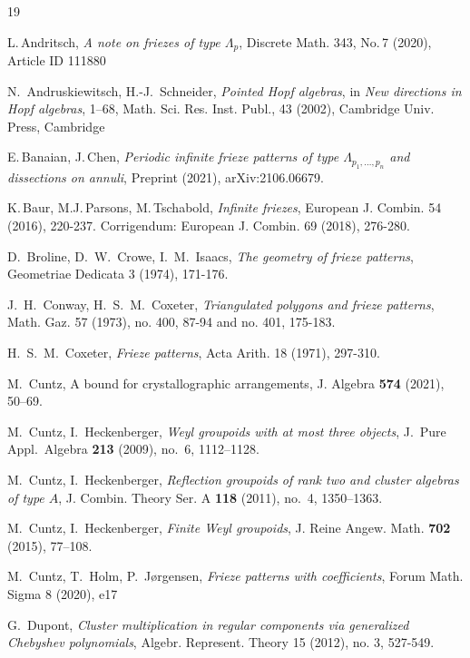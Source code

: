 \documentclass[11pt,a4paper]{amsart}
\theoremstyle{definition}
\numberwithin{equation}{section}
\begin{document}
\begin{thebibliography}{19}


L.\,Andritsch,
{\em A note on friezes of type $\Lambda_p$},
Discrete Math. 343, No.\,7 (2020), Article ID 111880

N.\ Andruskiewitsch, H.-J.\ Schneider,
{\em Pointed Hopf algebras}, in {\it New directions in Hopf algebras}, 1--68, Math. Sci. Res. Inst. Publ., 43 (2002), Cambridge Univ. Press, Cambridge

E.\,Banaian, J.\,Chen,
{\em Periodic infinite frieze patterns of type $\Lambda_{p_1,\ldots,p_n}$ and
dissections on annuli},
Preprint (2021), arXiv:2106.06679.

K.\,Baur, M.J.\,Parsons, M.\,Tschabold,
{\em Infinite friezes},
European J. Combin. 54 (2016), 220-237. 
Corrigendum: European J. Combin. 69 (2018), 276-280.

D.\ Broline, D.\ W.\ Crowe, I.\ M.\ Isaacs,
{\em The geometry of frieze patterns}, 
Geometriae Dedicata 3 (1974), 171-176.


J.\ H.\ Conway, H.\ S.\ M.\ Coxeter, 
{\em Triangulated polygons and frieze patterns}, Math. Gaz. 57 (1973), no. 400, 87-94 and   
no. 401, 175-183.

H.\ S.\ M.\ Coxeter, 
{\em Frieze patterns}, Acta Arith. 18 (1971), 297-310.

M.~Cuntz, A bound for crystallographic arrangements, J. Algebra {\bf 574} (2021), 50--69.

M.~Cuntz, I.~Heckenberger, \emph{Weyl groupoids with at most three objects}, J.~Pure
  Appl.~Algebra \textbf{213} (2009), no.~6, 1112--1128.

M.~Cuntz, I.~Heckenberger, \emph{Reflection groupoids of rank two and cluster algebras of type $A$}, J. Combin. Theory Ser. A {\bf 118} (2011), no.~4, 1350--1363.

M.~Cuntz, I.~Heckenberger, \emph{Finite {W}eyl groupoids}, J. Reine Angew.
  Math. \textbf{702} (2015), 77--108.

M.\ Cuntz, T.\ Holm, P.\ J{\o}rgensen,
{\em Frieze patterns with coefficients},
Forum Math. Sigma 8 (2020), e17  

G.\, Dupont,
{\em Cluster multiplication in regular components via generalized Chebyshev polynomials}, 
Algebr. Represent. Theory 15 (2012), no. 3, 527-549. 


\end{thebibliography}
\end{document}
